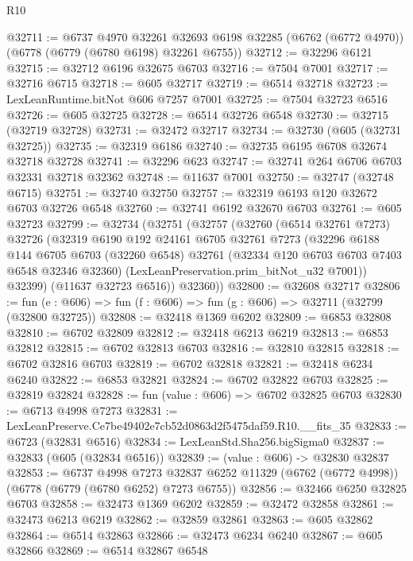\begin{lexlean}{R10}
\begin{coremodule}
@32711 := @6737
    @4970
    @32261
    @32693
    @6198
    @32285
    (@6762 (@6772 @4970))
    (@6778 (@6779 (@6780 @6198) @32261 @6755))
@32712 := @32296 @6121
@32715 := @32712 @6196 @32675 @6703
@32716 := @7504 @7001
@32717 := @32716 @6715
@32718 := @605 @32717
@32719 := @6514 @32718
@32723 := LexLeanRuntime.bitNot @606 @7257 @7001
@32725 := @7504 @32723 @6516
@32726 := @605 @32725
@32728 := @6514 @32726 @6548
@32730 := @32715 (@32719 @32728)
@32731 := @32472 @32717
@32734 := @32730 (@605 (@32731 @32725))
@32735 := @32319 @6186
@32740 := @32735 @6195 @6708 @32674 @32718 @32728
@32741 := @32296 @623
@32747 := @32741 @264 @6706 @6703 @32331 @32718 @32362
@32748 := @11637 @7001
@32750 := @32747 (@32748 @6715)
@32751 := @32740 @32750
@32757 := @32319 @6193 @120 @32672 @6703 @32726 @6548
@32760 := @32741 @6192 @32670 @6703
@32761 := @605 @32723
@32799 := @32734
    (@32751
      (@32757
        (@32760
          (@6514 @32761 @7273)
          @32726
          (@32319
            @6190
            @192
            @24161
            @6705
            @32761
            @7273
            (@32296
              @6188
              @144
              @6705
              @6703
              (@32260 @6548)
              @32761
              (@32334 @120 @6703 @6703 @7403 @6548 @32346 @32360)
              (LexLeanPreservation.prim_bitNot_u32 @7001))
            @32399)
          (@11637 @32723 @6516))
        @32360))
@32800 := @32608 @32717
@32806 := fun (e : @606) => fun (f : @606) => fun (g : @606) => @32711 (@32799 (@32800 @32725))
@32808 := @32418 @1369 @6202
@32809 := @6853 @32808
@32810 := @6702 @32809
@32812 := @32418 @6213 @6219
@32813 := @6853 @32812
@32815 := @6702 @32813 @6703
@32816 := @32810 @32815
@32818 := @6702 @32816 @6703
@32819 := @6702 @32818
@32821 := @32418 @6234 @6240
@32822 := @6853 @32821
@32824 := @6702 @32822 @6703
@32825 := @32819 @32824
@32828 := fun (value : @606) => @6702 @32825 @6703
@32830 := @6713 @4998 @7273
@32831 := LexLeanPreserve.Ce7be49402e7cb52d0863d2f5475daf59.R10.__fits_35
@32833 := @6723 (@32831 @6516)
@32834 := LexLeanStd.Sha256.bigSigma0
@32837 := @32833 (@605 (@32834 @6516))
@32839 := (value : @606) -> @32830 @32837
@32853 := @6737
    @4998
    @7273
    @32837
    @6252
    @11329
    (@6762 (@6772 @4998))
    (@6778 (@6779 (@6780 @6252) @7273 @6755))
@32856 := @32466 @6250 @32825 @6703
@32858 := @32473 @1369 @6202
@32859 := @32472 @32858
@32861 := @32473 @6213 @6219
@32862 := @32859 @32861
@32863 := @605 @32862
@32864 := @6514 @32863
@32866 := @32473 @6234 @6240
@32867 := @605 @32866
@32869 := @6514 @32867 @6548

\end{coremodule}
\end{lexlean}
